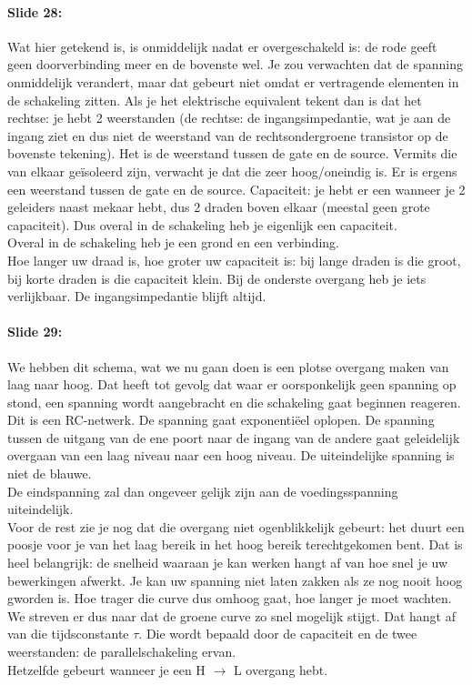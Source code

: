 \documentclass[10pt,a4paper]{book}
\begin{document}
\paragraph{Slide 28:} Wat hier getekend is, is onmiddelijk nadat er overgeschakeld is: de rode geeft geen doorverbinding meer en de bovenste wel. Je zou verwachten dat de spanning onmiddelijk verandert, maar dat gebeurt niet omdat er vertragende elementen in de schakeling zitten. Als je het elektrische equivalent tekent dan is dat het rechtse: je hebt 2 weerstanden (de rechtse: de ingangsimpedantie, wat je aan de ingang ziet en dus niet de weerstand van de rechtsondergroene transistor op de bovenste tekening). Het is de weerstand tussen de gate en de source. Vermits die van elkaar ge\"isoleerd zijn, verwacht je dat die zeer hoog/oneindig is. Er is ergens een weerstand tussen de gate en de source. Capaciteit: je hebt er een wanneer je 2 geleiders naast mekaar hebt, dus 2 draden boven elkaar (meestal geen grote capaciteit). Dus overal in de schakeling heb je eigenlijk een capaciteit.\\
Overal in de schakeling heb je een grond en een verbinding.\\
Hoe langer uw draad is, hoe groter uw capaciteit is: bij lange draden is die groot, bij korte draden is die capaciteit klein. 
Bij de onderste overgang heb je iets verlijkbaar. De ingangsimpedantie blijft altijd. 

\paragraph{Slide 29:} We hebben dit schema, wat we nu gaan doen is een plotse overgang maken van laag naar hoog. Dat heeft tot gevolg dat waar er oorsponkelijk geen spanning op stond, een spanning wordt aangebracht en die schakeling gaat beginnen reageren. Dit is een RC-netwerk. De spanning gaat exponenti\"eel oplopen. De spanning tussen de uitgang van de ene poort naar de ingang van de andere gaat geleidelijk overgaan van een laag niveau naar een hoog niveau. De uiteindelijke spanning is niet de blauwe.\\
De eindspanning zal dan ongeveer gelijk zijn aan de voedingsspanning uiteindelijk.\\
Voor de rest zie je nog dat die overgang niet ogenblikkelijk gebeurt: het duurt een poosje voor je van het laag bereik in het hoog bereik terechtgekomen bent. Dat is heel belangrijk: de snelheid waaraan je kan werken hangt af van hoe snel je uw bewerkingen afwerkt. Je kan uw spanning niet laten zakken als ze nog nooit hoog gworden is. Hoe trager die curve dus omhoog gaat, hoe langer je moet wachten. We streven er dus naar dat de groene curve zo snel mogelijk stijgt. Dat hangt af van die tijdsconstante $\tau$. Die wordt bepaald door de capaciteit en de twee weerstanden: de parallelschakeling ervan.\\
Hetzelfde gebeurt wanneer je een H $\rightarrow$ L overgang hebt. 
\end{document}
